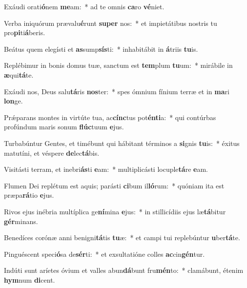 \item Exáudi orati\textbf{ó}nem \textbf{me}am:~* ad te omnis \textbf{ca}ro \textbf{vé}niet.
\item Verba iniquórum prævalu\textbf{é}runt \textbf{su}\textbf{per} nos:~* et impietátibus nostris tu pro\textbf{pi}ti\textbf{á}beris.
\item Beátus quem elegísti et \textbf{as}sump\textbf{sís}ti:~* inhabitábit in \textbf{á}triis \textbf{tu}is.
\item Replébimur in bonis domus tuæ, sanctum est \textbf{tem}plum \textbf{tu}um:~* mirábile in \textbf{æ}qui\textbf{tá}te.
\item Exáudi nos, Deus salu\textbf{tá}ris \textbf{nos}ter:~* spes ómnium fínium terræ et in \textbf{ma}ri \textbf{lon}ge.
\item Prǽparans montes in virtúte tua, ac\textbf{cínc}tus pot\textbf{én}\textbf{ti}a:~* qui contúrbas profúndum maris sonum \textbf{flúc}tuum \textbf{e}jus.
\item Turbabúntur Gentes, et timébunt qui hábitant términos a \textbf{si}gnis \textbf{tu}is:~* éxitus matutíni, et véspere \textbf{de}lec\textbf{tá}bis.
\item Visitásti terram, et inebri\textbf{ás}ti \textbf{e}am:~* multiplicásti locuple\textbf{tá}re \textbf{e}am.
\item Flumen Dei replétum est aquis; parásti \textbf{ci}bum il\textbf{ló}rum:~* quóniam ita est præpa\textbf{rá}tio \textbf{e}jus.
\item Rivos ejus inébria multíplica ge\textbf{ní}mina \textbf{e}jus:~* in stillicídiis ejus læ\textbf{tá}bitur \textbf{gér}minans.
\item Benedíces corónæ anni benigni\textbf{tá}tis \textbf{tu}æ:~* et campi tui replebúntur \textbf{u}ber\textbf{tá}te.
\item Pinguéscent speci\textbf{ó}sa de\textbf{sér}ti:~* et exsultatióne colles \textbf{ac}cin\textbf{gén}tur.
\item Indúti sunt aríetes óvium et valles abun\textbf{dá}bunt fru\textbf{mén}to:~* clamábunt, étenim \textbf{hym}num \textbf{di}cent.
